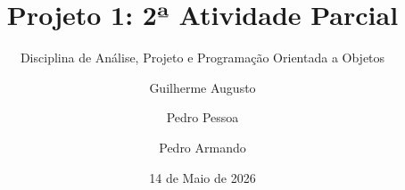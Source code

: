 \title{Projeto 1: 2ª Atividade Parcial}
\subtitle{Disciplina de Análise, Projeto e Programação Orientada a Objetos}
\author{Guilherme Augusto \and Pedro Pessoa \and Pedro Armando}
\date{14 de Maio de 2026}
